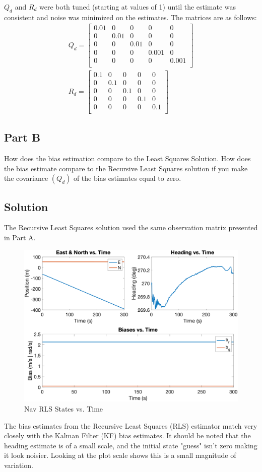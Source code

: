 \documentclass{article}
\begin{document}
$Q_d$ and $R_d$ were both tuned (starting at values of 1) until the estimate was consistent and noise was minimized on the estimates.  The matrices are as follows:
\begin{gather*}
    Q_d = \begin{bmatrix}
        0.01 & 0 & 0 & 0 & 0\\
        0 & 0.01 & 0 & 0 & 0\\
        0 & 0 & 0.01 & 0 & 0\\
        0 & 0 & 0 & 0.001 & 0\\
        0 & 0 & 0 & 0 & 0.001\\
    \end{bmatrix}\\
    R_d = \begin{bmatrix}
        0.1 & 0 & 0 & 0 & 0\\
        0 & 0.1 & 0 & 0 & 0\\
        0 & 0 & 0.1 & 0 & 0\\
        0 & 0 & 0 & 0.1 & 0\\
        0 & 0 & 0 & 0 & 0.1\\
    \end{bmatrix}
\end{gather*}

\subsection*{Part B}
How does the bias estimation compare to the Least Squares Solution. How does the bias estimate compare to the Recursive Least Squares solution if 
you make the covariance $(Q_d)$ of the bias estimates equal to zero.
\subsection*{Solution}
The Recursive Least Squares solution used the same observation matrix presented in Part A.
\begin{figure}[H]
    \centering
    \includegraphics[width=0.75\linewidth]{../figures/p3b.png}
    \caption{Nav RLS States vs. Time}\label{fig:p3b}
\end{figure}
The bias estimates from the Recursive Least Squares (RLS) estimator match very closely with the Kalman Filter (KF) bias estimates.  It should be 
noted that the heading estimate is of a small scale, and the initial state "guess" isn't zero making it look noisier.  Looking at the plot scale 
shows this is a small magnitude of variation.
\end{document}
